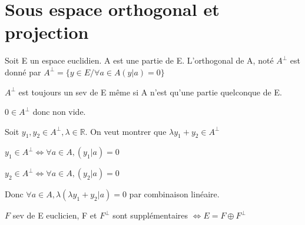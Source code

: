 \documentclass[french]{yLectureNote}
\newcommand{\R}[0]{\mathbb{R}}
\begin{document}
\section{Sous espace orthogonal et projection}
\begin{definition}
    Soit E un espace euclidien. A est une partie de E. L'orthogonal de A, noté 
    $A^{\perp}$ est donné par $A^{\perp} = \{y\in E/ \forall a \in A (y|a)=0\}$
\end{definition}
\begin{proposition}
    $A^{\perp}$ est toujours un sev de E m\^eme si A n'est qu'une partie quelconque de E.
\end{proposition}
\begin{myproof}
    $0\in A^{\perp}$  donc non vide.

    Soit $y_1, y_2\in A^{\perp}, \lambda\in \R$. On veut montrer que $\lambda y_1+y_2\in A^{\perp}$ 

    $y_1\in A^{\perp}\iff \forall a \in A, (y_1|a) = 0$

    $y_2\in A^{\perp}\iff \forall a \in A, (y_2|a) = 0$

    Donc $\forall a \in A, \lambda (\lambda y_1+y_2 | a) = 0$ par combinaison linéaire.
\end{myproof}
\begin{proposition}
    $F$ sev de E euclicien, F et $F^{\perp}$ sont supplémentaires $\iff E = F\oplus F^{\perp}$
\end{proposition}
\end{document}
